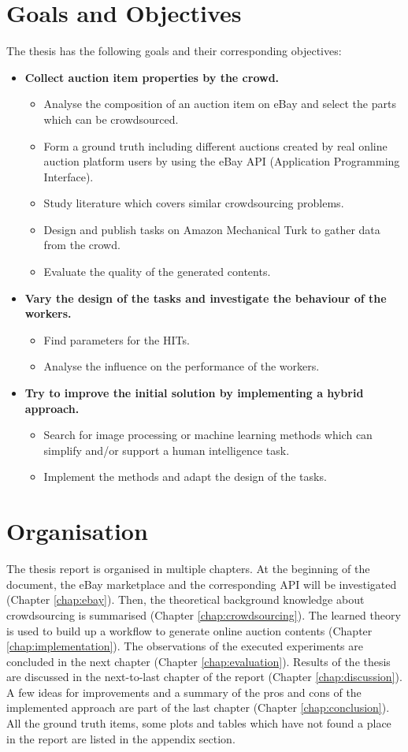 \documentclass[a4paper]{report}
\begin{document}
\section{Goals and Objectives}
The thesis has the following goals and their corresponding objectives:
\begin{itemize}
	\item \textbf{Collect auction item properties by the crowd.}
	\begin{itemize}
		\item Analyse the composition of an auction item on eBay and select the parts which can be crowdsourced.
		\item Form a ground truth including different auctions created by real online auction platform users by using the eBay API (Application Programming Interface).
		\item Study literature which covers similar crowdsourcing problems.
		\item Design and publish tasks on Amazon Mechanical Turk to gather data from the crowd.
		\item Evaluate the quality of the generated contents.
	\end{itemize}
	\item \textbf{Vary the design of the tasks and investigate the behaviour of the workers.}
	\begin{itemize}
		\item Find parameters for the HITs.
		\item Analyse the influence on the performance of the workers.
	\end{itemize}
	\item \textbf{Try to improve the initial solution by implementing a hybrid approach.}
	\begin{itemize}
		\item Search for image processing or machine learning methods which can simplify and/or support a human intelligence task.
		\item Implement the methods and adapt the design of the tasks.
	\end{itemize}
\end{itemize}

\section{Organisation}
The thesis report is organised in multiple chapters. At the beginning of the document, the eBay marketplace and the corresponding API will be investigated (Chapter \ref{chap:ebay}). Then, the theoretical background knowledge about crowdsourcing is summarised (Chapter \ref{chap:crowdsourcing}). The learned theory is used to build up a workflow to generate online auction contents (Chapter \ref{chap:implementation}). The observations of the executed experiments are concluded in the next chapter (Chapter \ref{chap:evaluation}). Results of the thesis are discussed in the next-to-last chapter of the report (Chapter \ref{chap:discussion}). A few ideas for improvements and a summary of the pros and cons of the implemented approach are part of the last chapter (Chapter \ref{chap:conclusion}). All the ground truth items, some plots and tables which have not found a place in the report are listed in the appendix section.
\end{document}
